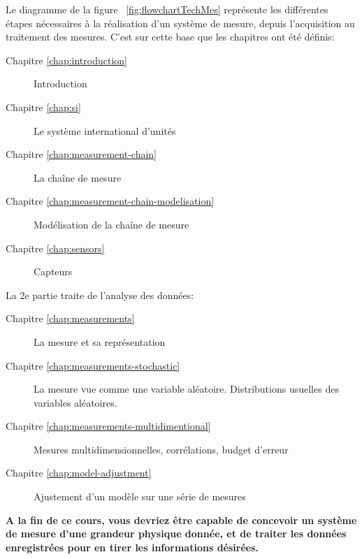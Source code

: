 Le diagramme de la figure  ~\ref{fig:flowchartTechMes} représente les différentes étapes nécessaires à la réalisation d'un système de mesure, depuis l'acquisition au traitement des mesures. C'est sur cette base que les chapitres ont été définis:

\begin{description}
    \item[Chapitre \ref{chap:introduction}] Introduction
    \item[Chapitre \ref{chap:si}] Le système international d'unités
    \item[Chapitre \ref{chap:measurement-chain}] La chaîne de mesure
    \item[Chapitre \ref{chap:measurement-chain-modelisation}] Modélisation de la chaîne de mesure
    \item[Chapitre \ref{chap:sensors}] Capteurs
\end{description}

La 2e partie traite de l'analyse des données:

\begin{description}
    \item[Chapitre \ref{chap:measurements}] La mesure et sa représentation
    \item[Chapitre \ref{chap:measurements-stochastic}] La mesure vue comme une variable aléatoire. Distributions usuelles des
          variables aléatoires.
    \item[Chapitre \ref{chap:measurements-multidimentional}] Mesures multidimensionnelles, corrélations, budget d'erreur
    \item[Chapitre \ref{chap:model-adjustment}] Ajustement d'un modèle sur une série de mesures
\end{description}

\textbf{A la fin de ce cours, vous devriez être capable de concevoir un système de mesure d'une grandeur physique donnée, et de traiter les données enregistrées pour en tirer les informations désirées.}
